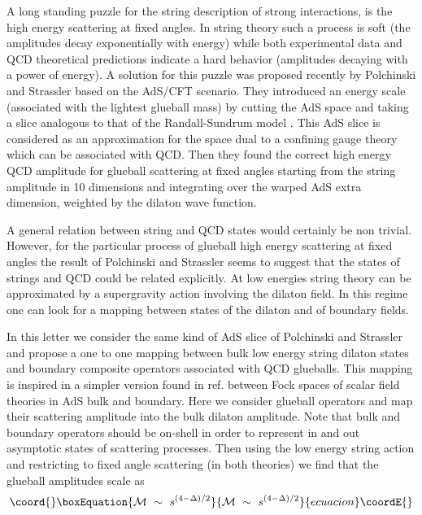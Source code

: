 \documentclass[a4paper,twocolumn,prd,groupedaddress,nofootinbib]{revtex4}
\begin{document}
A long standing puzzle 
for the string description of strong interactions, 
is the high energy scattering at fixed angles.
In string theory such a process is soft (the amplitudes decay 
exponentially with energy) while both experimental data and QCD 
theoretical predictions\cite{QCD1,BRO} indicate a hard behavior 
(amplitudes decaying with a power of energy).
A solution for this puzzle was  proposed recently by 
Polchinski and Strassler\cite{PS} based on the AdS/CFT scenario. 
They introduced an energy scale (associated with the lightest 
glueball mass) by cutting the AdS space and taking a slice 
analogous to that of the Randall-Sundrum model \cite{RS1,RS2}. 
This AdS slice is considered as an approximation for the space 
dual to a confining gauge theory which can be associated with QCD.
Then they found the correct high energy QCD amplitude for glueball 
scattering at fixed angles starting from the string amplitude in 10 
dimensions and integrating over the warped AdS extra dimension, 
weighted by the dilaton wave function.

A general relation between string and QCD states 
would certainly be non trivial. 
However, for the particular process of glueball 
high energy scattering at fixed angles 
the result of Polchinski and Strassler 
seems to suggest that the states of 
strings and QCD could be related explicitly. 
At low energies string theory can be approximated by a
supergravity action involving the dilaton field.
In this regime one can look for a mapping between states 
of the dilaton and of boundary fields.

In this letter we consider the same kind of AdS slice of Polchinski 
and Strassler \cite{PS} and propose a one to one mapping between 
bulk low energy string dilaton states and boundary composite 
operators associated with QCD glueballs.
This mapping is inspired in a simpler version found in ref.\cite{BB2} 
between Fock spaces of  scalar field theories in  AdS bulk and boundary.
Here we consider glueball operators  and map their scattering amplitude 
into the bulk dilaton amplitude.
Note that bulk and boundary operators should be on-shell in order
to represent in and out asymptotic states of scattering processes. 
Then using the low energy string action and restricting to fixed angle 
scattering (in both theories) we find that the glueball amplitudes scale 
as
\begin{equation}\coord{}\boxEquation{
\label{scale}
{\cal M} \,\,\sim \,\, s^{(4-\Delta )/2}
}{
{\cal M} \,\,\sim \,\, s^{(4-\Delta )/2}
}{ecuacion}\coordE{}\end{equation}
\end{document}
